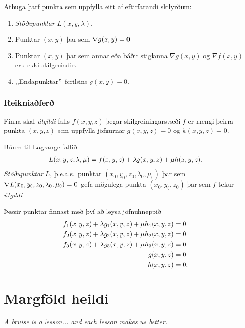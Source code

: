 \documentclass[a4paper,10pt,icelandic]{sphinxmanual}
\begin{document}
Athuga þarf punkta sem uppfylla eitt af eftirfarandi skilyrðum:
\begin{enumerate}
\item {} 
\textit{Stöðupunktar} \(L(x,y,\lambda)\).

\item {} 
Punktar \((x,y)\) þar sem \(\nabla g(x,y)=\mbox{${\bf 0}$}\)

\item {} 
Punktar \((x,y)\) þar sem annar eða báðir stiglanna
\(\nabla g(x,y)\) og \(\nabla f(x,y)\) eru ekki skilgreindir.

\item {} 
,,Endapunktar” ferilsins \(g(x,y)=0\).

\end{enumerate}


\subsection{Reikniaðferð}
\label{Kafli3:id14}
Finna skal  \textit{útgildi} falls \(f(x,y,z)\) þegar skilgreiningarsvæði
\(f\) er mengi þeirra punkta \((x,y,z)\) sem uppfylla jöfnurnar
\(g(x,y,z)=0\) og \(h(x,y,z)=0\).

Búum til Lagrange-fallið
\begin{gather}
\begin{split}L(x,y,z,\lambda,\mu)=f(x,y,z)+\lambda g(x,y,z)+\mu h(x,y,z).\end{split}\notag
\end{gather}
\textit{Stöðupunktar} \(L\), þ.e.a.s. punktar
\((x_0,y_0,z_0,\lambda_0,\mu_0)\) þar sem
\(\nabla L(x_0,y_0,z_0,\lambda_0,\mu_0)=\mbox{${\bf 0}$}\) gefa
mögulega punkta \((x_0,y_0,z_0)\) þar sem \(f\) tekur  \textit{útgildi}.

Þessir punktar finnast með því að leysa jöfnuhneppið
\begin{gather}
\begin{split}\begin{aligned}
f_1(x,y,z)+\lambda g_1(x,y,z)+\mu h_1(x,y,z)&=0\\
f_2(x,y,z)+\lambda g_2(x,y,z)+\mu h_2(x,y,z)&=0\\
f_3(x,y,z)+\lambda g_3(x,y,z)+\mu h_3(x,y,z)&=0\\
g(x,y,z)&=0\\
h(x,y,z)&=0.\end{aligned}\end{split}\notag
\end{gather}

\chapter{Margföld heildi}
\label{Kafli4::doc}\label{Kafli4:margfold-heildi}
\emph{A bruise is a lesson... and each lesson makes us better.}
\end{document}
